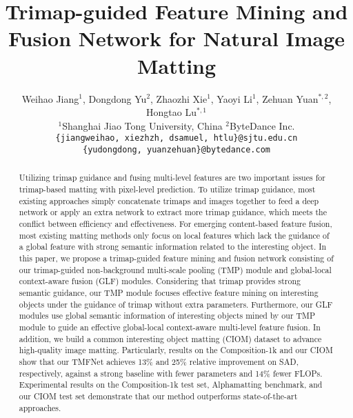 \documentclass[10pt,twocolumn,letterpaper]{article}
\begin{document}
\title{Trimap-guided Feature Mining and Fusion Network for  Natural Image Matting}
\author{Weihao Jiang$^{1}$, Dongdong Yu$^{2}$, Zhaozhi Xie$^{1}$, Yaoyi Li$^{1}$, Zehuan Yuan$^{*,2}$, Hongtao Lu$^{*,1}$\\
$^{1}$Shanghai Jiao Tong University, China \quad 
$^{2}$ByteDance Inc.\\
{\tt\small \{jiangweihao, xiezhzh, dsamuel, htlu\}@sjtu.edu.cn} \\
{\tt\small \{yudongdong,  yuanzehuan\}@bytedance.com}
}
\maketitle
\let\thefootnote\relax{}
\let\thefootnote\relax{}
\begin{abstract}
   Utilizing trimap guidance and fusing multi-level features are two important issues for trimap-based matting with pixel-level prediction. To utilize trimap guidance, most existing approaches simply concatenate trimaps and images together to feed a deep network or apply an extra network to extract more trimap guidance, which meets the conflict between efficiency and effectiveness. For emerging content-based feature fusion, most existing matting methods only focus on local features which lack the guidance of a global feature with strong semantic information related to the interesting object. In this paper, we propose a trimap-guided feature mining and fusion network consisting of our trimap-guided non-background multi-scale pooling (TMP) module and global-local context-aware fusion (GLF) modules. Considering that trimap provides strong semantic guidance, our TMP module focuses effective feature mining on interesting objects under the guidance of trimap without extra parameters. Furthermore, our GLF modules use global semantic information of interesting objects mined by our TMP module to guide an effective global-local context-aware multi-level feature fusion. In addition, we build a common interesting object matting (CIOM) dataset to advance high-quality image matting. Particularly,
results on the Composition-1k and our CIOM show that our
TMFNet achieves 13\% and 25\% relative improvement on SAD,
respectively, against a strong baseline with fewer parameters
and 14\% fewer FLOPs. Experimental results on the Composition-1k test set, Alphamatting benchmark, and our CIOM test set demonstrate that our method outperforms state-of-the-art approaches. 
\end{abstract}
\end{document}

